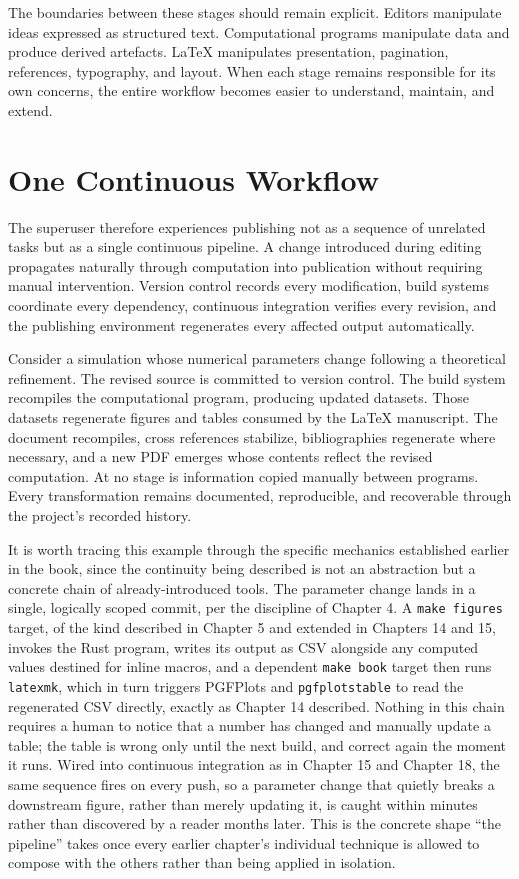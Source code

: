 The boundaries between these stages should remain explicit. Editors manipulate ideas expressed as structured text. Computational programs manipulate data and produce derived artefacts. LaTeX manipulates presentation, pagination, references, typography, and layout. When each stage remains responsible for its own concerns, the entire workflow becomes easier to understand, maintain, and extend.

\hypertarget{one-continuous-workflow}{%
\section{One Continuous Workflow}\label{one-continuous-workflow}}

The superuser therefore experiences publishing not as a sequence of unrelated tasks but as a single continuous pipeline. A change introduced during editing propagates naturally through computation into publication without requiring manual intervention. Version control records every modification, build systems coordinate every dependency, continuous integration verifies every revision, and the publishing environment regenerates every affected output automatically.

Consider a simulation whose numerical parameters change following a theoretical refinement. The revised source is committed to version control. The build system recompiles the computational program, producing updated datasets. Those datasets regenerate figures and tables consumed by the LaTeX manuscript. The document recompiles, cross references stabilize, bibliographies regenerate where necessary, and a new PDF emerges whose contents reflect the revised computation. At no stage is information copied manually between programs. Every transformation remains documented, reproducible, and recoverable through the project's recorded history.

It is worth tracing this example through the specific mechanics established earlier in the book, since the continuity being described is not an abstraction but a concrete chain of already-introduced tools. The parameter change lands in a single, logically scoped commit, per the discipline of Chapter 4. A \texttt{make\ figures} target, of the kind described in Chapter 5 and extended in Chapters 14 and 15, invokes the Rust program, writes its output as CSV alongside any computed values destined for inline macros, and a dependent \texttt{make\ book} target then runs \texttt{latexmk}, which in turn triggers PGFPlots and \texttt{pgfplotstable} to read the regenerated CSV directly, exactly as Chapter 14 described. Nothing in this chain requires a human to notice that a number has changed and manually update a table; the table is wrong only until the next build, and correct again the moment it runs. Wired into continuous integration as in Chapter 15 and Chapter 18, the same sequence fires on every push, so a parameter change that quietly breaks a downstream figure, rather than merely updating it, is caught within minutes rather than discovered by a reader months later. This is the concrete shape ``the pipeline'' takes once every earlier chapter's individual technique is allowed to compose with the others rather than being applied in isolation.

